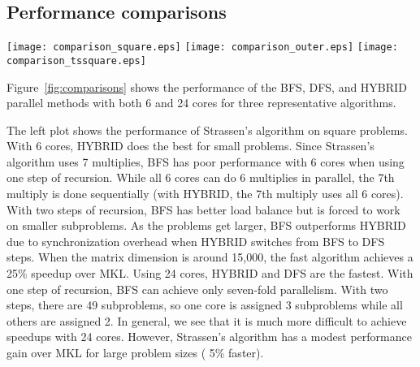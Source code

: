 \documentclass[preprint]{sigplanconf}
\begin{document}
\subsection{Performance comparisons}

\begin{figure*}[tb]
\centering
\texttt{[image: comparison\_square.eps]}
\texttt{[image: comparison\_outer.eps]}
\texttt{[image: comparison\_tssquare.eps]}
\caption{
Effective performance (Equation~\eqref{eqn:eff_perf}) comparison of the BFS, DFS, and HYBRID parallel implementations on a few fast algorithms and problem sizes.
We use 6 and 24 cores to show the bandwidth limitations of the matrix additions.
(Left): 
Strassen's algorithm on square problems.
With 6 cores, we see significant speedups on large problems.
(Middle):
The  fast algorithm (26 multiplies) on  problems.
HYBRID performs the best in all cases.
With 6 cores, the fast algorithm consistently outperforms MKL.
With 24 cores, the fast algorithm can achieve significant speedups for small problem sizes.
(Right):
The  fast algorithm (29 multiplies) on  problems.
HYBRID again performs the best.
With 24 cores, the fast algorithm gets modest speedups over MKL and achieves significant speedups on small problems.
}
\label{fig:comparisons}
\end{figure*}

Figure~\ref{fig:comparisons} shows the performance of the BFS, DFS, and HYBRID parallel methods with both 6 and 24 cores for three  representative algorithms.

The left plot shows the performance of Strassen's algorithm on square problems.
With 6 cores, HYBRID does the best for small problems.
Since Strassen's algorithm uses 7 multiplies, BFS has poor performance with 6 cores when using one step of recursion.
While all 6 cores can do 6 multiplies in parallel, the 7th multiply is done sequentially (with HYBRID, the 7th multiply uses all 6 cores).
With two steps of recursion, BFS has better load balance but is forced to work on smaller subproblems.
As the problems get larger, BFS outperforms HYBRID due to synchronization overhead when HYBRID switches from BFS to DFS steps.
When the matrix dimension is around 15,000, the fast algorithm achieves a 25\% speedup over MKL.
Using 24 cores, HYBRID and DFS are the fastest.
With one step of recursion, BFS can achieve only seven-fold parallelism.
With two steps, there are 49 subproblems, so one core is assigned 3 subproblems while all others are assigned 2.
In general, we see that it is much more difficult to achieve speedups with 24 cores.
However, Strassen's algorithm has a modest performance gain over MKL for large problem sizes ( 5\% faster).
\end{document}
